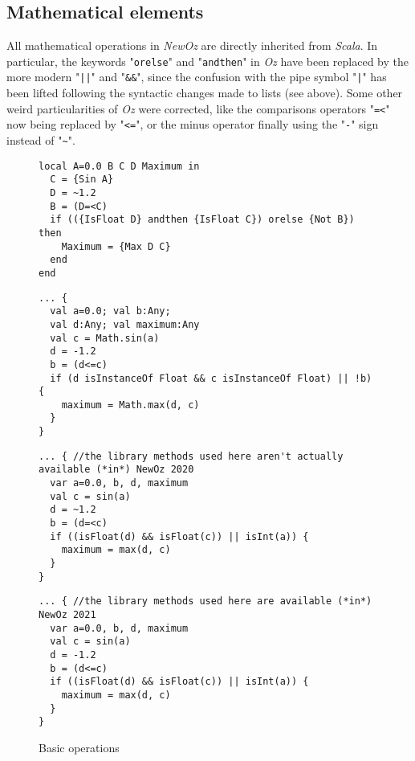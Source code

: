 \subsection{Mathematical elements}
All mathematical operations in \textit{NewOz} are directly inherited from \textit{Scala}.
In particular, the keywords "\texttt{orelse}" and "\texttt{andthen}" in \textit{Oz} have been replaced by the more modern "\texttt{||}" and "\texttt{\&\&}", since the confusion with the pipe symbol "\texttt{|}" has been lifted following the syntactic changes made to lists (see above).
Some other weird particularities of \textit{Oz} were corrected, like the comparisons operators "\texttt{=<}" now being replaced by "\texttt{<=}", or the minus operator finally using the "\texttt{-}" sign instead of "\texttt{\~}".
\begin{figure}
    \caption{Basic operations}
    \noindent\begin{minipage}{.49\textwidth}
                 \begin{lstlisting}[title={Oz},language=oz]
local A=0.0 B C D Maximum in
  C = {Sin A}
  D = ~1.2
  B = (D=<C)
  if (({IsFloat D} andthen {IsFloat C}) orelse {Not B}) then
    Maximum = {Max D C}
  end
end
                 \end{lstlisting}
    \end{minipage}
    \hfill
    \noindent\begin{minipage}{.49\textwidth}
                 \begin{lstlisting}[title={Scala/Ozma}]
... {
  val a=0.0; val b:Any;
  val d:Any; val maximum:Any
  val c = Math.sin(a)
  d = -1.2
  b = (d<=c)
  if (d isInstanceOf Float && c isInstanceOf Float) || !b) {
    maximum = Math.max(d, c)
  }
}
                 \end{lstlisting}
    \end{minipage}
    \noindent\begin{minipage}{.49\textwidth}
     \begin{lstlisting}[title={NewOz 2020},language=newoz]
... { //the library methods used here aren't actually available (*in*) NewOz 2020
  var a=0.0, b, d, maximum
  val c = sin(a)
  d = ~1.2
  b = (d=<c)
  if ((isFloat(d) && isFloat(c)) || isInt(a)) {
    maximum = max(d, c)
  }
}
     \end{lstlisting}
    \end{minipage}
    \hfill
    \noindent\begin{minipage}{.49\textwidth}
     \begin{lstlisting}[title={NewOz 2021},language=newoz]
... { //the library methods used here are available (*in*) NewOz 2021
  var a=0.0, b, d, maximum
  val c = sin(a)
  d = -1.2
  b = (d<=c)
  if ((isFloat(d) && isFloat(c)) || isInt(a)) {
    maximum = max(d, c)
  }
}
     \end{lstlisting}
    \end{minipage}
\end{figure}

